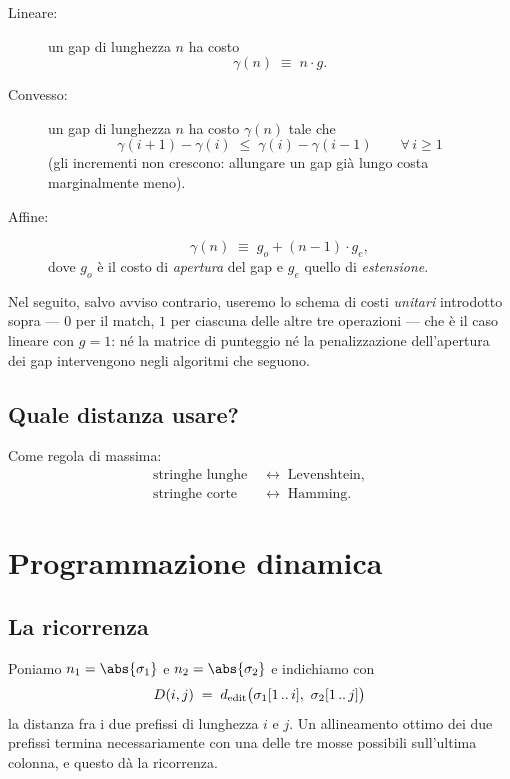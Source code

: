 \begin{description}
  \item[Lineare:] un gap di lunghezza $n$ ha costo
    \[
      \gamma(n)\;\equiv\;n\cdot g .
    \]
  \item[Convesso:] un gap di lunghezza $n$ ha costo $\gamma(n)$ tale che
    \[
      \gamma(i+1)-\gamma(i)\;\le\;\gamma(i)-\gamma(i-1)
      \qquad \forall\, i\ge 1
    \]
    (gli incrementi non crescono: allungare un gap già lungo costa
    marginalmente meno).
  \item[Affine:]
    \[
      \gamma(n)\;\equiv\;g_o+(n-1)\cdot g_e ,
    \]
    dove $g_o$ è il costo di \emph{apertura} del gap e $g_e$ quello di
    \emph{estensione}.
\end{description}

Nel seguito, salvo avviso contrario, useremo lo schema di costi \emph{unitari}
introdotto sopra --- $0$ per il match, $1$ per ciascuna delle altre tre
operazioni --- che è il caso lineare con $g=1$: né la matrice di punteggio né la
penalizzazione dell'apertura dei gap intervengono negli algoritmi che seguono.

\subsection{Quale distanza usare?}

%
Come regola di massima:
\begin{align*}
  \text{stringhe lunghe} &\;\longleftrightarrow\; \text{Levenshtein},\\
  \text{stringhe corte}  &\;\longleftrightarrow\; \text{Hamming}.
\end{align*}


\section{Programmazione dinamica}

\subsection{La ricorrenza}

Poniamo $n_1=\abs{\sigma_1}$ e $n_2=\abs{\sigma_2}$ e indichiamo con
\[
  \Dm{i}{j}\;=\;\dedit\bigl(\pre{\sigma_1}{i},\ \pre{\sigma_2}{j}\bigr)
\]
la distanza fra i due prefissi di lunghezza $i$ e $j$. Un allineamento ottimo
dei due prefissi termina necessariamente con una delle tre mosse possibili
sull'ultima colonna, e questo dà la ricorrenza.

